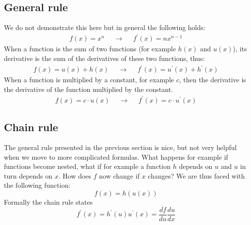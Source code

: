 \documentclass[a4paper]{report}
\begin{document}
\subsection{General rule}
We do not demonstrate this here but in general the following holds:
\begin{align}
f(x)=x^n & &\rightarrow & &f^\prime(x)=nx^{n-1}
\end{align}
When a function is the sum of two functions (for example $h(x)$ and $u(x)$), its derivative is the sum of the derivatives of these two functions, thus:
\begin{align}
f(x)=u(x)+h(x)& &\rightarrow & & f^\prime(x)=u^\prime(x)+h^\prime(x)
\end{align}
When a function is multiplied by a constant, for example $c$, then the derivative is the derivative of the function multiplied by the constant.
\begin{align}
f(x)=c\cdot u(x)& &\rightarrow & & f^\prime(x)=c\cdot u^\prime(x)
\end{align}

\subsection{Chain rule}
The general rule presented in the previous section is nice, but not very helpful when we move to more complicated formulas. What happens for example if functions become nested, what if for example a function $h$ depends on $u$ and $u$ in turn depends on $x$. How does $f$ now change if $x$ changes? We are thus faced with the following function:
\begin{equation}
f(x) = h(u(x))
\end{equation}
Formally the chain rule states
\begin{equation}
f^\prime(x)=h^\prime(u) u^\prime(x) = \frac{df}{du}\frac{du}{dx}
\end{equation}
\end{document}
